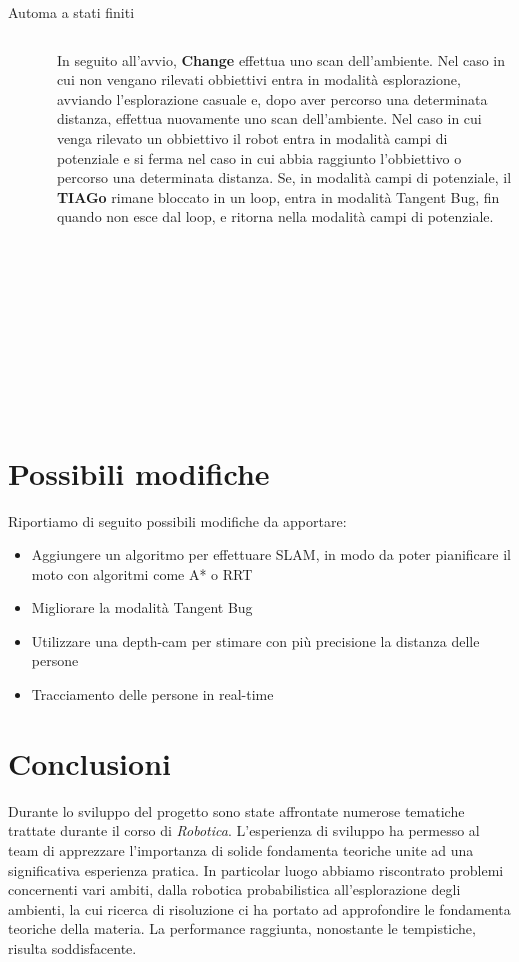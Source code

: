 \documentclass[10pt]{beamer}
\begin{document}
	\begin{frame}{Automa a stati finiti}
	
	\begin{columns}
		\begin{column}{0.4\textwidth}
			\begin{figure}[H]
				\centering
				\texttt{[image: ./img/fsa.pdf]}
				\label{fig:fsa}
			\end{figure}
		\end{column}	
		\begin{column}{0.6\textwidth}
		\justifying
	In seguito all'avvio, \textbf{Change}
	effettua uno scan dell'ambiente. Nel caso in cui non vengano rilevati
	obbiettivi entra in modalità esplorazione, avviando l'esplorazione casuale
	e, dopo aver percorso una determinata distanza, effettua nuovamente uno
	scan dell'ambiente. Nel caso in cui venga rilevato un obbiettivo il robot
	entra in modalità campi di potenziale e si ferma nel caso in cui abbia
	raggiunto l'obbiettivo o percorso una determinata distanza. Se, in modalità
	campi di potenziale, il \textbf{TIAGo} rimane bloccato in un loop, entra in
	modalità Tangent Bug, fin quando non esce dal loop, e ritorna nella
	modalità campi di potenziale.
		\end{column}
	\end{columns}	
	
	
	\end{frame}
	
	\section{Possibili modifiche}\label{sec:Possibli-modifiche}
	\frame{\sectionpage}
	Riportiamo di seguito possibili modifiche da apportare:
	\begin{itemize}
		\item Aggiungere un algoritmo per effettuare SLAM, in modo da poter
			pianificare il moto con algoritmi come A* \cite{A*} o RRT
			\cite{RRT}
		\item Migliorare la modalità Tangent Bug
		\item Utilizzare una depth-cam per stimare con più precisione la
			distanza delle persone
		\item Tracciamento delle persone in real-time
	\end{itemize}

	\section{Conclusioni}\label{sec:Conclusioni}
	\frame{\sectionpage}
	Durante lo sviluppo del progetto sono state affrontate numerose tematiche
	trattate durante il corso di \textit{Robotica}. L'esperienza di sviluppo ha
	permesso al team di apprezzare l'importanza di solide fondamenta teoriche
	unite ad una significativa esperienza pratica. In particolar luogo abbiamo
	riscontrato problemi concernenti vari ambiti, dalla robotica probabilistica
	all'esplorazione degli ambienti, la cui ricerca di risoluzione ci ha
	portato ad approfondire le fondamenta teoriche della materia. La
	performance raggiunta, nonostante le tempistiche, risulta soddisfacente.
\end{document}
